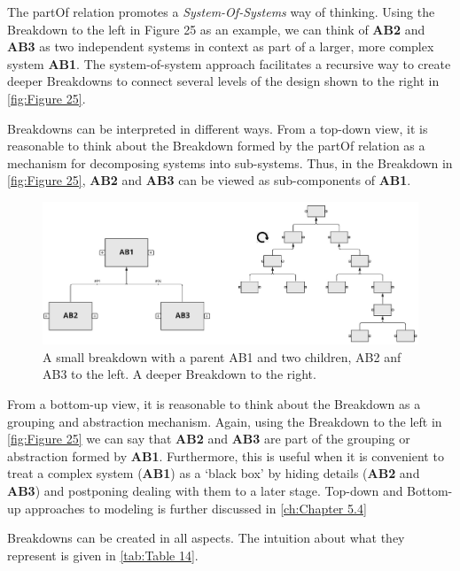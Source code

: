 The partOf relation promotes a \emph{System-Of-Systems} way of thinking. Using the Breakdown to the left in Figure
25 as an example, we can think of \textbf{AB2} and \textbf{AB3} as two independent systems in context as part of a
larger, more complex system \textbf{AB1}. The system-of-system approach facilitates a recursive way to create deeper
Breakdowns to connect several levels of the design shown to the right in \autoref{fig:Figure 25}.

Breakdowns can be interpreted in different ways. From a top-down view, it is reasonable to think about the Breakdown
formed by the partOf relation as a mechanism for decomposing systems into sub-systems. Thus, in the Breakdown in
\autoref{fig:Figure 25}, \textbf{AB2} and \textbf{AB3} can be viewed as sub-components of \textbf{AB1}.

\begin{figure}[htb]
  \centering
  \includegraphics[width=1\textwidth]{img/IMFmanual-img044.jpg}
  \caption{A small breakdown with a parent AB1 and two children, AB2 anf AB3 to the left. A deeper Breakdown to the right.}
  \label{fig:Figure 25}
\end{figure}

From a bottom-up view, it is reasonable to think about the Breakdown as a grouping and abstraction mechanism. Again,
using the Breakdown to the left in \autoref{fig:Figure 25} we can say that \textbf{AB2 }and \textbf{AB3 }are part of the grouping
or abstraction formed by \textbf{AB1}. Furthermore, this is useful when it is convenient to treat a complex system
(\textbf{AB1}) as a `black box' by hiding details (\textbf{AB2 }and\textbf{ AB3}) and postponing dealing with them to
a later stage. Top-down and Bottom-up approaches to modeling is further discussed in \autoref{ch:Chapter 5.4}

Breakdowns can be created in all aspects. The intuition about what they represent is given in \autoref{tab:Table 14}.

